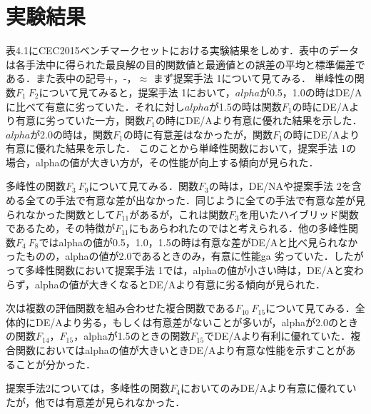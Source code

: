 \documentclass[a4paper,11pt,oneside,openany]{jsbook}
\begin{document}
\section{実験結果}
表4.1にCEC2015ベンチマークセットにおける実験結果をしめす．表中のデータは各手法中に得られた最良解の目的関数値と最適値との誤差の平均と標準偏差である．また表中の記号+，-，$\approx$
まず提案手法 1について見てみる．
単峰性の関数$F_{1}~F_{2}$について見てみると，提案手法 1において，$alpha$が0.5，1.0の時はDE/Aに比べて有意に劣っていた．それに対し$alpha$が1.5の時は関数$F_{1}$の時にDE/Aより有意に劣っていた一方，関数$F_{1}$の時にDE/Aより有意に優れた結果を示した．$alpha$が2.0の時は，関数$F_{1}$の時に有意差はなかったが，関数$F_{1}$の時にDE/Aより有意に優れた結果を示した．
このことから単峰性関数において，提案手法 1の場合，alphaの値が大きい方が，その性能が向上する傾向が見られた．

多峰性の関数$F_{3}~F_{9}$について見てみる．関数$F_{3}$の時は，DE/NAや提案手法 2を含める全ての手法で有意な差が出なかった．同じように全ての手法で有意な差が見られなかった関数として$F_{11}$があるが，これは関数$F_{3}$を用いたハイブリッド関数であるため，その特徴が$F_{11}$にもあらわれたのではと考えられる．他の多峰性関数$F_{4}~F_{8}$ではalphaの値が0.5，1.0，1.5の時は有意な差がDE/Aと比べ見られなかったものの，alphaの値が2.0であるときのみ，有意に性能ga
劣っていた．したがって多峰性関数において提案手法 1では，alphaの値が小さい時は，DE/Aと変わらず，alphaの値が大きくなるとDE/Aより有意に劣る傾向が見られた．

次は複数の評価関数を組み合わせた複合関数である$F_{10}~F_{15}$について見てみる．全体的にDE/Aより劣る，もしくは有意差がないことが多いが，alphaが2.0のときの関数$F_{14}$，$F_{15}$，alphaが1.5のときの関数$F_{15}$でDE/Aより有利に優れていた．複合関数においてはalphaの値が大きいときDE/Aより有意な性能を示すことがあることが分かった．

提案手法2については，多峰性の関数$F_{4}$においてのみDE/Aより有意に優れていたが，他では有意差が見られなかった．
\end{document}
